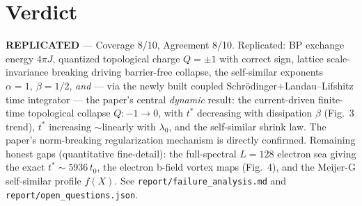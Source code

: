 \documentclass[11pt]{article}
\begin{document}
\section{Verdict}

\textbf{REPLICATED} --- Coverage 8/10, Agreement 8/10. Replicated: BP exchange
energy $4\pi J$, quantized topological charge $Q=\pm1$ with correct sign, lattice
scale-invariance breaking driving barrier-free collapse, the self-similar
exponents $\alpha=1,\ \beta=1/2$, \emph{and} --- via the newly built coupled
Schr\"odinger$+$Landau--Lifshitz time integrator --- the paper's central
\emph{dynamic} result: the current-driven finite-time topological collapse
$Q:-1\!\to\!0$, with $t^*$ decreasing with dissipation $\beta$ (Fig.~3 trend),
$t^*$ increasing $\sim$linearly with $\lambda_0$, and the self-similar shrink law.
The paper's norm-breaking regularization mechanism is directly confirmed.
Remaining honest gaps (quantitative fine-detail): the full-spectral $L=128$
electron sea giving the exact $t^*\!\sim\!5936\,t_0$, the electron b-field vortex
maps (Fig.~4), and the Meijer-G self-similar profile $f(X)$. See
\texttt{report/failure\_analysis.md} and \texttt{report/open\_questions.json}.
\end{document}

